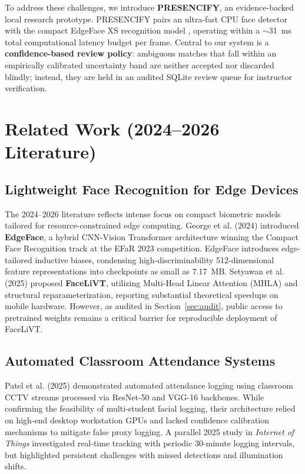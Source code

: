 \documentclass[conference]{IEEEtran}
\begin{document}
To address these challenges, we introduce \textbf{PRESENCIFY}, an evidence-backed local research prototype. PRESENCIFY pairs an ultra-fast CPU face detector with the compact EdgeFace XS recognition model \cite{george2024edgeface}, operating within a $\sim$31~ms total computational latency budget per frame. Central to our system is a \textbf{confidence-based review policy}: ambiguous matches that fall within an empirically calibrated uncertainty band are neither accepted nor discarded blindly; instead, they are held in an audited SQLite review queue for instructor verification.

\section{Related Work (2024--2026 Literature)}

\subsection{Lightweight Face Recognition for Edge Devices}
The 2024--2026 literature reflects intense focus on compact biometric models tailored for resource-constrained edge computing. George et al. (2024) \cite{george2024edgeface} introduced \textbf{EdgeFace}, a hybrid CNN-Vision Transformer architecture winning the Compact Face Recognition track at the EFaR 2023 competition. EdgeFace introduces edge-tailored inductive biases, condensing high-discriminability 512-dimensional feature representations into checkpoints as small as 7.17~MB. Setyawan et al. (2025) \cite{setyawan2025facelivt} proposed \textbf{FaceLiVT}, utilizing Multi-Head Linear Attention (MHLA) and structural reparameterization, reporting substantial theoretical speedups on mobile hardware. However, as audited in Section~\ref{sec:audit}, public access to pretrained weights remains a critical barrier for reproducible deployment of FaceLiVT.

\subsection{Automated Classroom Attendance Systems}
Patel et al. (2025) \cite{patel2025cctv} demonstrated automated attendance logging using classroom CCTV streams processed via ResNet-50 and VGG-16 backbones. While confirming the feasibility of multi-student facial logging, their architecture relied on high-end desktop workstation GPUs and lacked confidence calibration mechanisms to mitigate false proxy logging. A parallel 2025 study in \textit{Internet of Things} \cite{alqurishi2025iot} investigated real-time tracking with periodic 30-minute logging intervals, but highlighted persistent challenges with missed detections and illumination shifts.
\end{document}
